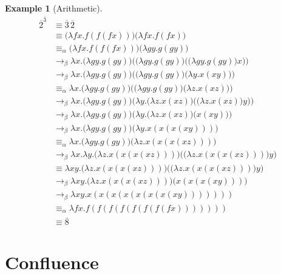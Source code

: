 \documentclass[a4paper, 11pt]{article}
\theoremstyle{plain}
\theoremstyle{definition}
\newtheorem{example}{Example}[section]
\theoremstyle{remark}
\newcommand\acong{\equiv_\alpha}
\newcommand\bcon{\mathrel{\rightarrow_\beta}}
\begin{document}
\begin{example}[Arithmetic]
\item \begin{align*}
{\overline 2}^{\overline 3} &\equiv \overline 3 \, \overline 2 \\
&\equiv \big( \lambda fx . f(f(fx)) \big) \big( \lambda fx . f(fx) \big) \\
&\acong \big( \lambda fx . f(f(fx)) \big) \big( \lambda gy . g(gy) \big) \\
&\bcon \lambda x . \big( \lambda gy . g(gy) \big) \Big( \big( \lambda gy . g(gy) \big) \big( \big( \lambda gy . g(gy) \big) x \big) \Big) \\
&\bcon \lambda x . \big( \lambda gy . g(gy) \big) \Big( \big( \lambda gy . g(gy) \big) \big( \lambda y . x(xy) \big) \Big) \\
&\acong \lambda x . \big( \lambda gy . g(gy) \big) \Big( \big( \lambda gy . g(gy) \big) \big( \lambda z . x(xz) \big) \Big) \\
&\bcon \lambda x . \big( \lambda gy . g(gy) \big) \bigg( \lambda y . \big( \lambda z . x(xz) \big) \Big( \big( \lambda z . x(xz) \big) y \Big) \bigg) \\
&\bcon \lambda x . \big( \lambda gy . g(gy) \big) \Big( \lambda y . \big( \lambda z . x(xz) \big) \big( x(xy) \big) \Big) \\
&\bcon \lambda x . \big( \lambda gy . g(gy) \big) \big( \lambda y . x(x(x(xy))) \big) \\
&\acong \lambda x . \big( \lambda gy . g(gy) \big) \big( \lambda z . x(x(x(xz))) \big) \\
&\bcon \lambda x . \lambda y . \big( \lambda z . x(x(x(xz))) \big) \Big( \big( \lambda z . x(x(x(xz))) \big) y \Big) \\
&\equiv \lambda xy . \big( \lambda z . x(x(x(xz))) \big) \Big( \big( \lambda z . x(x(x(xz))) \big) y \Big) \\
&\bcon \lambda xy . \big( \lambda z . x(x(x(xz))) \big) \big( x(x(x(xy))) \big)\\
&\bcon \lambda xy . x(x(x(x(x(x(x(xy))))))) \\
&\acong \lambda fx . f(f(f(f(f(f(f(fx))))))) \\
&\equiv \overline 8
\end{align*}
\end{example}



\section{Confluence}
\end{document}
